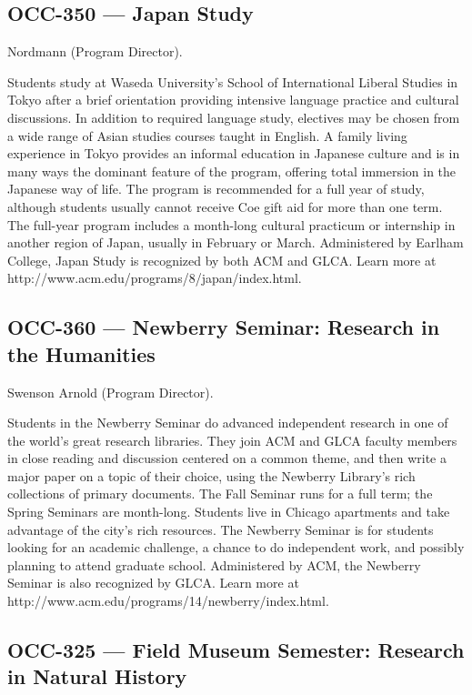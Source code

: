 \documentclass[
  letterpaper,
]{scrbook}
\begin{document}
\subsection{OCC-350 --- Japan Study}\label{occ-350-japan-study}

Nordmann (Program Director).

Students study at Waseda University's School of International Liberal
Studies in Tokyo after a brief orientation providing intensive language
practice and cultural discussions. In addition to required language
study, electives may be chosen from a wide range of Asian studies
courses taught in English. A family living experience in Tokyo provides
an informal education in Japanese culture and is in many ways the
dominant feature of the program, offering total immersion in the
Japanese way of life. The program is recommended for a full year of
study, although students usually cannot receive Coe gift aid for more
than one term. The full-year program includes a month-long cultural
practicum or internship in another region of Japan, usually in February
or March. Administered by Earlham College, Japan Study is recognized by
both ACM and GLCA. Learn more at
http://www.acm.edu/programs/8/japan/index.html.

\subsection{OCC-360 --- Newberry Seminar: Research in the
Humanities}\label{occ-360-newberry-seminar-research-in-the-humanities}

Swenson Arnold (Program Director).

Students in the Newberry Seminar do advanced independent research in one
of the world's great research libraries. They join ACM and GLCA faculty
members in close reading and discussion centered on a common theme, and
then write a major paper on a topic of their choice, using the Newberry
Library's rich collections of primary documents. The Fall Seminar runs
for a full term; the Spring Seminars are month-long. Students live in
Chicago apartments and take advantage of the city's rich resources. The
Newberry Seminar is for students looking for an academic challenge, a
chance to do independent work, and possibly planning to attend graduate
school. Administered by ACM, the Newberry Seminar is also recognized by
GLCA. Learn more at http://www.acm.edu/programs/14/newberry/index.html.

\subsection{OCC-325 --- Field Museum Semester: Research in Natural
History}\label{occ-325-field-museum-semester-research-in-natural-history}
\end{document}
